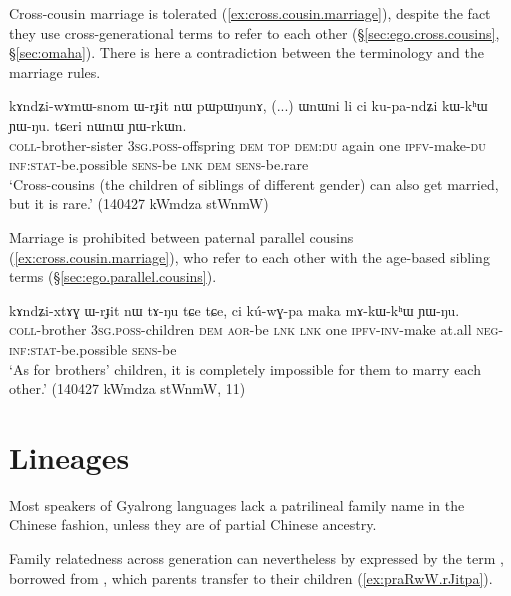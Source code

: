 Cross-cousin marriage is tolerated (\ref{ex:cross.cousin.marriage}), despite the fact they use cross-gen\-er\-ation\-al terms to refer to each other (§\ref{sec:ego.cross.cousins}, §\ref{sec:omaha}). There is here a contradiction between the terminology and the marriage rules.

\begin{exe}
\ex \label{ex:cross.cousin.marriage}
\gll kɤndʑi-wɤmɯ-snom ɯ-rɟit nɯ pɯpɯŋunɤ, (...) ɯnɯni li ci ku-pa-ndʑi kɯ-kʰɯ ɲɯ-ŋu. tɕeri nɯnɯ ɲɯ-rkɯn. \\
\textsc{coll}-brother-sister \textsc{3sg}.\textsc{poss}-offspring \textsc{dem} \textsc{top} { } \textsc{dem}:\textsc{du} again one \textsc{ipfv}-make-\textsc{du} \textsc{inf}:\textsc{stat}-be.possible \textsc{sens}-be \textsc{lnk} \textsc{dem} \textsc{sens}-be.rare \\ 
\glt `Cross-cousins (the children of siblings of different gender) can also get married, but it is rare.' (140427 kWmdza stWnmW)
\end{exe}

Marriage is prohibited between paternal parallel cousins (\ref{ex:cross.cousin.marriage}), who refer to each other with the age-based sibling terms (§\ref{sec:ego.parallel.cousins}).

\begin{exe}
\ex \label{ex:FBCh.marriage}
\gll kɤndʑi-xtɤɣ ɯ-rɟit nɯ tɤ-ŋu tɕe tɕe, ci kú-wɣ-pa maka mɤ-kɯ-kʰɯ ɲɯ-ŋu. \\
\textsc{coll}-brother \textsc{3sg}.\textsc{poss}-children \textsc{dem} \textsc{aor}-be \textsc{lnk} \textsc{lnk} one \textsc{ipfv}-\textsc{inv}-make at.all \textsc{neg}-\textsc{inf}:\textsc{stat}-be.possible \textsc{sens}-be \\
\glt `As for brothers' children, it is completely impossible for them to marry each other.' (140427 kWmdza stWnmW, 11)
\end{exe}

\section{Lineages} \label{sec:lineage.kinship}
Most speakers of Gyalrong languages lack a patrilineal family name in the Chinese fashion, unless they are of partial Chinese ancestry. 

Family relatedness across generation can nevertheless by expressed by the term , borrowed from , which parents transfer to their children (\ref{ex:praRwW.rJitpa}).

